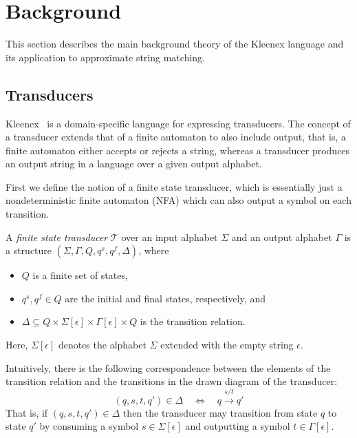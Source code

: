 \section{Background}

This section describes the main background theory of the Kleenex language and
its application to approximate string matching.

\subsection{Transducers}

Kleenex~\cite{grathwohl2016kleenex,soholm2015ordered} is a domain-specific
language for expressing transducers. The concept of a transducer extends that
of a finite automaton to also include output, that is, a finite automaton
either accepts or rejects a string, whereas a transducer produces an output
string in a language over a given output alphabet.

First we define the notion of a finite state transducer, which is essentially
just a nondeterministic finite automaton (NFA) which can also output a symbol
on each transition.

\begin{definition}[FST]
  A \emph{finite state transducer} $\mathcal{T}$ over an input alphabet
  $\Sigma$ and an output alphabet $\Gamma$ is a structure
  $(\Sigma, \Gamma, Q, q^s, q^f, \Delta)$, where
  \begin{itemize}
      \item $Q$ is a finite set of states,
      \item $q^s, q^f \in Q$ are the initial and final states,
        respectively, and
      \item $\Delta \subseteq Q \times \Sigma[\epsilon] \times
        \Gamma[\epsilon] \times Q$ is the transition relation.
  \end{itemize}
\end{definition}

\noindent
Here, $\Sigma[\epsilon]$ denotes the alphabet $\Sigma$ extended with the empty
string $\epsilon$.

Intuitively, there is the following correspondence between the elements of the
transition relation and the transitions in the drawn diagram of the transducer:
\[
  (q, s, t, q') \in \Delta \quad \Leftrightarrow \quad q \xrightarrow{s/t} q'
\]
That is, if $(q, s, t, q') \in \Delta$ then the transducer may transition from
state $q$ to state $q'$ by consuming a symbol $s \in \Sigma[\epsilon]$ and
outputting a symbol $t \in \Gamma[\epsilon]$.

